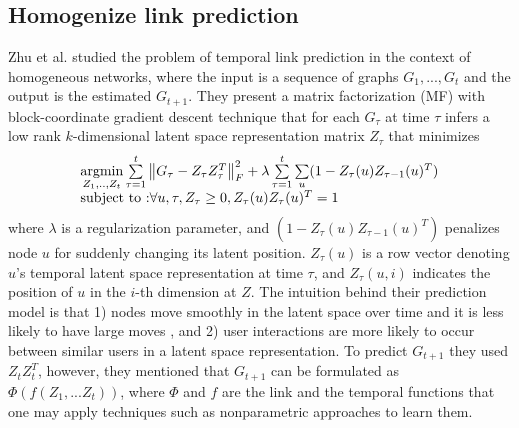 
\subsection{Homogenize link prediction}

Zhu et al. \cite{Zhu2016} studied the problem of temporal link prediction in the context of homogeneous networks, where the input is a sequence of graphs $G_1, ..., G_t$ and the output is the estimated $G_{t+1}$. They present a matrix factorization (MF) with block-coordinate gradient descent technique that for each $G_\tau$ at time $\tau$ infers a low rank $k$-dimensional latent space representation matrix $Z_\tau$ that minimizes %
\begin{equation}\label{latentOrigEqu}
    \begin{array}{l}
\operatorname*{argmin}\limits_{Z_1, .., Z_t}\sum\limits_{\tau=1}^{t}\left \| G_\tau-Z_{\tau}Z_{\tau}^T \right \|^2_F+\lambda \sum\limits_{\tau=1}^{t}\sum\limits_{u}(1-Z_{\tau}(u)Z_{\tau-1}(u)^T) 
\\
\text{subject to :} \forall u,\tau,Z_{\tau}\geq 0, Z_{\tau}(u)Z_{\tau}(u)^T=1
    \end{array}
\end{equation}
where $\lambda$ is a regularization parameter, and  $(1-Z_{\tau}(u)Z_{\tau-1}(u)^T)$ penalizes node $u$ for suddenly changing its latent position. %
$Z_\tau(u)$ is a row vector denoting $u$'s temporal latent space representation at time $\tau$, and $Z_\tau(u,i)$ indicates the position of $u$ in the $i$-th dimension at $Z$. The intuition behind their prediction model is that 1) nodes move smoothly in the latent space over time and it is less likely to have large moves \cite{sarkar2005dynamic,zhang2014inferring}, and 2) user interactions are more likely to occur between similar users in a latent space representation. To predict $G_{t+1}$ they used $Z_tZ_t^T$, however, they mentioned that $G_{t+1}$ can be formulated as $\Phi(f(Z_1,...Z_t))$, where $\Phi$ and $f$ are the link and the temporal functions that one may apply techniques such as nonparametric approaches \cite{Sarkar:2012} to learn them.

